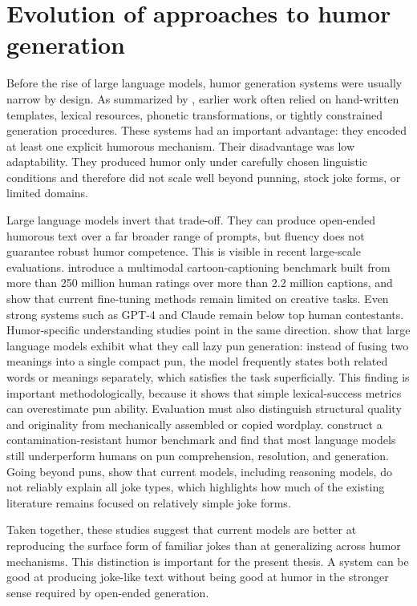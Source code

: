 \section{Evolution of approaches to humor generation}

Before the rise of large language models, humor generation systems were usually narrow by design. As summarized by \citet{amin2020survey}, earlier work often relied on hand-written templates, lexical resources, phonetic transformations, or tightly constrained generation procedures. These systems had an important advantage: they encoded at least one explicit humorous mechanism. Their disadvantage was low adaptability. They produced humor only under carefully chosen linguistic conditions and therefore did not scale well beyond punning, stock joke forms, or limited domains.

Large language models invert that trade-off. They can produce open-ended humorous text over a far broader range of prompts, but fluency does not guarantee robust humor competence. This is visible in recent large-scale evaluations. \citet{Zhang2024HumorAI} introduce a multimodal cartoon-captioning benchmark built from more than 250 million human ratings over more than 2.2 million captions, and show that current fine-tuning methods remain limited on creative tasks. Even strong systems such as GPT-4 and Claude remain below top human contestants. Humor-specific understanding studies point in the same direction. \citet{xu2024good} show that large language models exhibit what they call lazy pun generation: instead of fusing two meanings into a single compact pun, the model frequently states both related words or meanings separately, which satisfies the task superficially. This finding is important methodologically, because it shows that simple lexical-success metrics can overestimate pun ability. Evaluation must also distinguish structural quality and originality from mechanically assembled or copied wordplay. \citet{cocchieri2025you} construct a contamination-resistant humor benchmark and find that most language models still underperform humans on pun comprehension, resolution, and generation. Going beyond puns, \citet{loakman2025comparing} show that current models, including reasoning models, do not reliably explain all joke types, which highlights how much of the existing literature remains focused on relatively simple joke forms.

Taken together, these studies suggest that current models are better at reproducing the surface form of familiar jokes than at generalizing across humor mechanisms. This distinction is important for the present thesis. A system can be good at producing joke-like text without being good at humor in the stronger sense required by open-ended generation.

